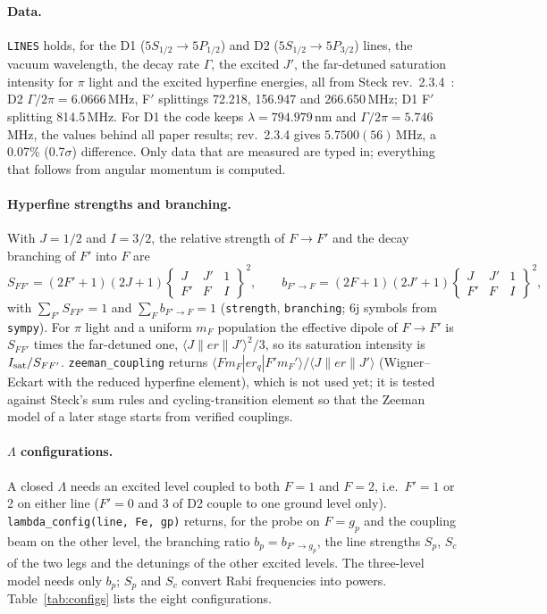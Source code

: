 \documentclass[11pt,a4paper]{article}
\newcommand{\code}[1]{\texttt{#1}}
\begin{document}
\paragraph{Data.} \code{LINES} holds, for the D1 ($5S_{1/2}\to5P_{1/2}$) and D2 ($5S_{1/2}\to5P_{3/2}$) lines, the vacuum wavelength, the decay rate $\Gamma$, the excited $J'$, the far-detuned saturation intensity for $\pi$ light and the excited hyperfine energies, all from Steck rev.~2.3.4~\cite{steck87}: D2 $\Gamma/2\pi=6.0666$\,MHz, F$'$ splittings 72.218, 156.947 and 266.650\,MHz; D1 F$'$ splitting 814.5\,MHz. For D1 the code keeps $\lambda=794.979$\,nm and $\Gamma/2\pi=5.746$\,MHz, the values behind all paper results; rev.~2.3.4 gives $5.7500(56)$\,MHz, a 0.07\% (0.7$\sigma$) difference. Only data that are measured are typed in; everything that follows from angular momentum is computed.

\paragraph{Hyperfine strengths and branching.} With $J=1/2$ and $I=3/2$, the relative strength of $F\to F'$ and the decay branching of $F'$ into $F$ are~\cite{steck87}
\begin{equation}
  S_{FF'}=(2F'+1)(2J+1)\begin{Bmatrix}J&J'&1\\F'&F&I\end{Bmatrix}^2,\qquad
  b_{F'\to F}=(2F+1)(2J'+1)\begin{Bmatrix}J&J'&1\\F'&F&I\end{Bmatrix}^2 ,
\end{equation}
with $\sum_{F'}S_{FF'}=1$ and $\sum_Fb_{F'\to F}=1$ (\code{strength}, \code{branching}; 6j symbols from \code{sympy}). For $\pi$ light and a uniform $m_F$ population the effective dipole of $F\to F'$ is $S_{FF'}$ times the far-detuned one, $\langle J\|er\|J'\rangle^2/3$, so its saturation intensity is $I_{\rm sat}/S_{FF'}$. \code{zeeman\_coupling} returns $\langle F m_F|er_q|F'm_F'\rangle/\langle J\|er\|J'\rangle$ (Wigner--Eckart with the reduced hyperfine element), which is not used yet; it is tested against Steck's sum rules and cycling-transition element so that the Zeeman model of a later stage starts from verified couplings.

\paragraph{$\Lambda$ configurations.} A closed $\Lambda$ needs an excited level coupled to both $F=1$ and $F=2$, i.e.\ $F'=1$ or 2 on either line ($F'=0$ and 3 of D2 couple to one ground level only). \code{lambda\_config(line, Fe, gp)} returns, for the probe on $F=g_p$ and the coupling beam on the other level, the branching ratio $b_p=b_{F'\to g_p}$, the line strengths $S_p$, $S_c$ of the two legs and the detunings of the other excited levels. The three-level model needs only $b_p$; $S_p$ and $S_c$ convert Rabi frequencies into powers. Table~\ref{tab:configs} lists the eight configurations.
\end{document}
